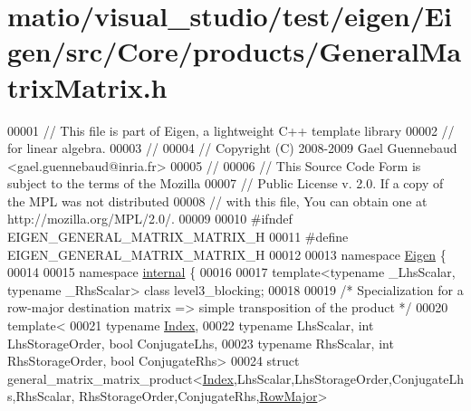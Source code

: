 \hypertarget{matio_2visual__studio_2test_2eigen_2_eigen_2src_2_core_2products_2_general_matrix_matrix_8h_source}{}\section{matio/visual\+\_\+studio/test/eigen/\+Eigen/src/\+Core/products/\+General\+Matrix\+Matrix.h}
\label{matio_2visual__studio_2test_2eigen_2_eigen_2src_2_core_2products_2_general_matrix_matrix_8h_source}

\begin{DoxyCode}
00001 \textcolor{comment}{// This file is part of Eigen, a lightweight C++ template library}
00002 \textcolor{comment}{// for linear algebra.}
00003 \textcolor{comment}{//}
00004 \textcolor{comment}{// Copyright (C) 2008-2009 Gael Guennebaud <gael.guennebaud@inria.fr>}
00005 \textcolor{comment}{//}
00006 \textcolor{comment}{// This Source Code Form is subject to the terms of the Mozilla}
00007 \textcolor{comment}{// Public License v. 2.0. If a copy of the MPL was not distributed}
00008 \textcolor{comment}{// with this file, You can obtain one at http://mozilla.org/MPL/2.0/.}
00009 
00010 \textcolor{preprocessor}{#ifndef EIGEN\_GENERAL\_MATRIX\_MATRIX\_H}
00011 \textcolor{preprocessor}{#define EIGEN\_GENERAL\_MATRIX\_MATRIX\_H}
00012 
00013 \textcolor{keyword}{namespace }\hyperlink{namespace_eigen}{Eigen} \{
00014 
00015 \textcolor{keyword}{namespace }\hyperlink{namespaceinternal}{internal} \{
00016 
00017 \textcolor{keyword}{template}<\textcolor{keyword}{typename} \_LhsScalar, \textcolor{keyword}{typename} \_RhsScalar> \textcolor{keyword}{class }level3\_blocking;
00018 
00019 \textcolor{comment}{/* Specialization for a row-major destination matrix => simple transposition of the product */}
00020 \textcolor{keyword}{template}<
00021   \textcolor{keyword}{typename} \hyperlink{namespace_eigen_a62e77e0933482dafde8fe197d9a2cfde}{Index},
00022   \textcolor{keyword}{typename} LhsScalar, \textcolor{keywordtype}{int} LhsStorageOrder, \textcolor{keywordtype}{bool} ConjugateLhs,
00023   \textcolor{keyword}{typename} RhsScalar, \textcolor{keywordtype}{int} RhsStorageOrder, \textcolor{keywordtype}{bool} ConjugateRhs>
00024 \textcolor{keyword}{struct }general\_matrix\_matrix\_product<\hyperlink{namespace_eigen_a62e77e0933482dafde8fe197d9a2cfde}{Index},LhsScalar,LhsStorageOrder,ConjugateLhs,RhsScalar,
      RhsStorageOrder,ConjugateRhs,\hyperlink{group__enums_ggaacded1a18ae58b0f554751f6cdf9eb13acfcde9cd8677c5f7caf6bd603666aae3}{RowMajor}>

\end{DoxyCode}
